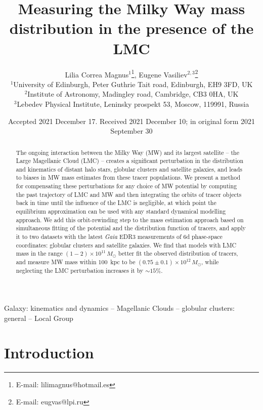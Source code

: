 \documentclass[usenatbib,fleqn]{mnras}
\title[Milky Way mass measurement with LMC]{Measuring the Milky Way mass distribution in the presence of the LMC}
\author[Correa Magnus \& Vasiliev]{
Lilia Correa Magnus$^{1}$\thanks{E-mail: lilimagnus@hotmail.es},
Eugene Vasiliev$^{2,3}$\thanks{E-mail: eugvas@lpi.ru}\\
$^1$University of Edinburgh, Peter Guthrie Tait road, Edinburgh, EH9 3FD, UK \\
$^2$Institute of Astronomy, Madingley road, Cambridge, CB3 0HA, UK\\
$^3$Lebedev Physical Institute, Leninsky prospekt 53, Moscow, 119991, Russia
}
\date{Accepted 2021 December 17. Received 2021 December 10; in original form 2021 September 30}
\newcommand{\Gaia}{\textit{Gaia}\xspace}
\begin{document}
\label{firstpage}
\setcounter{page}{2610}
\maketitle

\begin{abstract}
The ongoing interaction between the Milky Way (MW) and its largest satellite -- the Large Magellanic Cloud (LMC) -- creates a significant perturbation in the distribution and kinematics of distant halo stars, globular clusters and satellite galaxies, and leads to biases in MW mass estimates from these tracer populations. We present a method for compensating these perturbations for any choice of MW potential by computing the past trajectory of LMC and MW and then integrating the orbits of tracer objects back in time until the influence of the LMC is negligible, at which point the equilibrium approximation can be used with any standard dynamical modelling approach. We add this orbit-rewinding step to the mass estimation approach based on simultaneous fitting of the potential and the distribution function of tracers, and apply it to two datasets with the latest \Gaia EDR3 measurements of 6d phase-space coordinates: globular clusters and satellite galaxies. We find that models with LMC mass in the range $(1-2) \times 10^{11}\,M_\odot$ better fit the observed distribution of tracers, and measure MW mass within 100~kpc to be $(0.75\pm0.1)\times 10^{12}\,M_\odot$, while neglecting the LMC perturbation increases it by $\sim15$\%.
\end{abstract}

\begin{keywords}
Galaxy: kinematics and dynamics -- Magellanic Clouds -- globular clusters: general -- Local Group
\end{keywords}


\section{Introduction}   \label{sec:intro}
\end{document}
